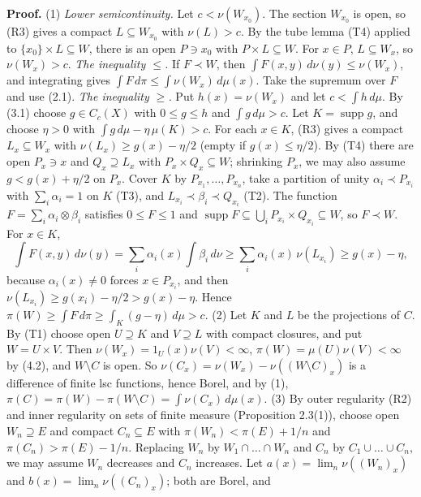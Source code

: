 \documentclass[
  english,
  11pt,
  a4paper,
]{article}
\begin{document}
\textbf{Proof.} (1) \emph{Lower semicontinuity.} Let \(c<\nu(W_{x_0})\).
The section \(W_{x_0}\) is open, so (R3) gives a compact
\(L\subseteq W_{x_0}\) with \(\nu(L)>c\). By the tube lemma (T4) applied
to \(\{x_0\}\times L\subseteq W\), there is an open \(P\ni x_0\) with
\(P\times L\subseteq W\). For \(x\in P\), \(L\subseteq W_x\), so
\(\nu(W_x)>c\). \emph{The inequality \(\leq\).} If \(F\prec W\), then
\(\int F(x,y)\,d\nu(y)\leq\nu(W_x)\), and integrating gives
\(\int F\,d\pi\leq\int\nu(W_x)\,d\mu(x)\). Take the supremum over \(F\)
and use (2.1). \emph{The inequality \(\geq\).} Put \(h(x)=\nu(W_x)\) and
let \(c<\int h\,d\mu\). By (3.1) choose \(g\in C_c(X)\) with
\(0\leq g\leq h\) and \(\int g\,d\mu>c\). Let
\(K=\operatorname{supp}g\), and choose \(\eta>0\) with
\(\int g\,d\mu-\eta\,\mu(K)>c\). For each \(x\in K\), (R3) gives a
compact \(L_x\subseteq W_x\) with \(\nu(L_x)\geq g(x)-\eta/2\) (empty if
\(g(x)\leq\eta/2\)). By (T4) there are open \(P_x\ni x\) and
\(Q_x\supseteq L_x\) with \(P_x\times Q_x\subseteq W\); shrinking
\(P_x\), we may also assume \(g<g(x)+\eta/2\) on \(P_x\). Cover \(K\) by
\(P_{x_1},\dots,P_{x_n}\), take a partition of unity
\(\alpha_i\prec P_{x_i}\) with \(\sum_i\alpha_i=1\) on \(K\) (T3), and
\(L_{x_i}\prec\beta_i\prec Q_{x_i}\) (T2). The function
\(F=\sum_i\alpha_i\otimes\beta_i\) satisfies \(0\leq F\leq1\) and
\(\operatorname{supp}F\subseteq\bigcup_i P_{x_i}\times Q_{x_i}\subseteq W\),
so \(F\prec W\). For \(x\in K\),
\[\int F(x,y)\,d\nu(y)=\sum_i\alpha_i(x)\int\beta_i\,d\nu\geq\sum_i\alpha_i(x)\,\nu(L_{x_i})\geq g(x)-\eta ,\]
because \(\alpha_i(x)\neq0\) forces \(x\in P_{x_i}\), and then
\(\nu(L_{x_i})\geq g(x_i)-\eta/2>g(x)-\eta\). Hence
\(\pi(W)\geq\int F\,d\pi\geq\int_K(g-\eta)\,d\mu>c\). (2) Let \(K\) and
\(L\) be the projections of \(C\). By (T1) choose open \(U\supseteq K\)
and \(V\supseteq L\) with compact closures, and put \(W=U\times V\).
Then \(\nu(W_x)=1_U(x)\nu(V)<\infty\), \(\pi(W)=\mu(U)\nu(V)<\infty\) by
(4.2), and \(W\setminus C\) is open. So
\(\nu(C_x)=\nu(W_x)-\nu((W\setminus C)_x)\) is a difference of finite
lsc functions, hence Borel, and by (1),
\(\pi(C)=\pi(W)-\pi(W\setminus C)=\int\nu(C_x)\,d\mu(x)\). (3) By outer
regularity (R2) and inner regularity on sets of finite measure
(Proposition 2.3(1)), choose open \(W_n\supseteq E\) and compact
\(C_n\subseteq E\) with \(\pi(W_n)<\pi(E)+1/n\) and
\(\pi(C_n)>\pi(E)-1/n\). Replacing \(W_n\) by \(W_1\cap\dots\cap W_n\)
and \(C_n\) by \(C_1\cup\dots\cup C_n\), we may assume \(W_n\) decreases
and \(C_n\) increases. Let \(a(x)=\lim_n\nu((W_n)_x)\) and
\(b(x)=\lim_n\nu((C_n)_x)\); both are Borel, and
\end{document}
